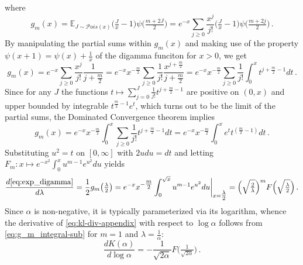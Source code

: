 \documentclass[a4paper,10pt,twocolumn]{article}
\begin{document}
where
\begin{equation}  \label{eq:g_m_series}
  g_m(x)
    =
    \mathbb{E}_{J\sim {\mathcal{P}ois}(x)}
      \bigl( \tfrac{J}x - 1 \bigr)
      \psi\bigl(\tfrac{m + 2 J}{2}\bigr)
    =
    e^{- x} \sum_{j \geq 0}
      \frac{x^j}{j!} \bigl( \tfrac{J}x - 1 \bigr)
      \psi\bigl(\tfrac{m + 2 j}{2}\bigr)
    \,.
\end{equation}
By manipulating the partial sums within $g_m(x)$ and making use of the property $
  \psi(x + 1) = \psi(x) + \tfrac1x
$ of the digamma funciton for $x > 0$, we get
\begin{equation}  \label{eq:g_m_series_int}
  g_m(x)
    = e^{- x} \sum_{j \geq 0}
      \frac{x^j}{j!} \frac1{j + \tfrac{m}2}
    = e^{- x} x^{- \tfrac{m}2} \sum_{j \geq 0}
      \frac1{j!}
      \frac{x^{j + \tfrac{m}2}}{j + \tfrac{m}2}
    = e^{- x} x^{- \tfrac{m}2} \sum_{j \geq 0}
      \frac1{j!} \int_0^x t^{j + \tfrac{m}2 - 1} dt
    \,.
\end{equation}
Since for any $J$ the functions $
  t \mapsto \sum_{j=0}^J \frac1{j!} t^{j + \tfrac{m}2 - 1}
$ are positive on $(0, x)$ and upper bounded by integrable $
  t^{\tfrac{m}2 - 1} e^t
$, which turns out to be the limit of the partial sums, the Dominated Convergence
theorem implies
\begin{equation}  \label{eq:g_m_integral}
  g_m(x)
    = e^{- x} x^{- \tfrac{m}2}
      \int_0^x \sum_{j \geq 0}
        \frac1{j!} t^{j + \tfrac{m}2 - 1} dt
    = e^{- x} x^{- \tfrac{m}2}
      \int_0^x e^t t^{(\tfrac{m}2 - 1)} dt
    \,.
\end{equation}
Substituting $u^2 = t$ on $[0, \infty]$ with $2u du = dt$ and letting $
  F_m
  \colon x \mapsto e^{-x^2} \int_0^x u^{m - 1} e^{u^2} du
$ yields
\begin{equation}  \label{eq:g_m_integral-sub}
  \frac{d \eqref{eq:exp_digamma}}{d \lambda}
    = \frac12 g_m\bigl(\tfrac\lambda2\bigr)
    = e^{-x}
      x^{-\tfrac{m}2}
      \int_0^{\sqrt{x}} u^{m - 1} e^{u^2} du
        \bigg\vert_{x=\tfrac\lambda2}
    = \Bigl(\sqrt{\tfrac2\lambda}\Bigr)^m F\Bigl(\sqrt{\tfrac\lambda2}\Bigr)
    \,.
\end{equation}
Since $\alpha$ is non-negative, it is typically parameterized via its logarithm, whence
the derivative of \eqref{eq:kl-div-appendix} with respect to $\log\alpha$ follows from
\eqref{eq:g_m_integral-sub} for $m=1$ and $\lambda = \tfrac1\alpha$:
\begin{equation}  \label{eq:real-kl-div-deriv-log}
  \frac{d K(\alpha)}{d\log \alpha}
    = - \frac1{\sqrt{2\alpha}} F\bigl(\tfrac1{\sqrt{2\alpha}}\bigr)
    \,.
\end{equation}
\end{document}
